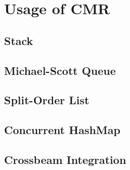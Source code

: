 \chapter{Usage of CMR}

\section{Stack}

\section{Michael-Scott Queue}

\section{Split-Order List}

\section{Concurrent HashMap}

\section{Crossbeam Integration}


